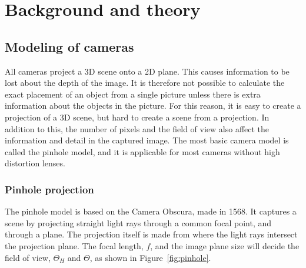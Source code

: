 
\chapter{Background and theory}
\section{Modeling of cameras}

All cameras project a 3D scene onto a 2D plane. This causes information to be lost about the depth of the image. It is therefore not possible to calculate the exact placement of an object from a single picture unless there is extra information about the objects in the picture. For this reason, it is easy to create a projection of a 3D scene, but hard to create a scene from a projection. In addition to this, the number of pixels and the field of view also affect the information and detail in the captured image. The most basic camera model is called the pinhole model, and it is applicable for most cameras without high distortion lenses.

\subsection{Pinhole projection} \label{sec:pinhole}
The pinhole model is based on the Camera Obscura, made in 1568. It captures a scene by projecting straight light rays through a common focal point, and through a plane. The projection itself is made from where the light rays intersect the projection plane. The focal length, $f$, and the image plane size will decide the field of view, $\Theta_H$ and $\Theta$, as shown in Figure~\ref{fig:pinhole}. 

